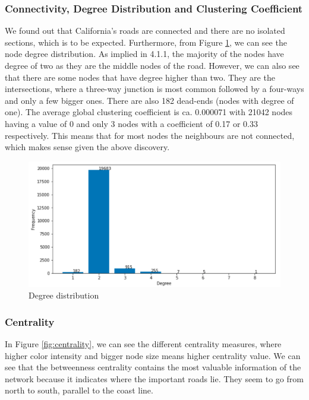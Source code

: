 \documentclass[11pt]{article}
\begin{document}
\subsubsection{Connectivity, Degree Distribution and Clustering Coefficient}
We found out that California's roads are connected and there are no isolated sections, which is to be expected. Furthermore, from Figure \ref{fig:degree}, we can see the node degree distribution. As implied in 4.1.1, the majority of the nodes have degree of two as they are the middle nodes of the road. However, we can also see that there are some nodes that have degree higher than two. They are the intersections, where a three-way junction is most common followed by a four-ways and only a few bigger ones. There are also 182 dead-ends (nodes with degree of one).
The average global clustering coefficient is ca. 0.000071 with 21042 nodes having a value of 0 and only 3 nodes with a coefficient of 0.17 or 0.33 respectively. This means that for most nodes the neighbours are not connected, which makes sense given the above discovery. 

\begin{figure}[h]
\caption{Degree distribution}
\label{fig:degree}
\centering
\includegraphics[scale=0.3]{degree.png}
\end{figure}

\subsubsection{Centrality}
In Figure \ref{fig:centrality}, we can see the different centrality measures, where higher color intensity and bigger node size means higher centrality value.  We can see that the betweenness centrality contains the most valuable information of the network because it indicates where the important roads lie. They seem to go from north to south, parallel to the coast line.
\end{document}

